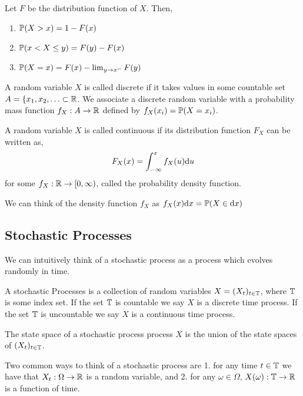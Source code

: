 \documentclass[12pt]{article}
\begin{document}
\begin{lemma}
Let \( F \) be the distribution function of \( X \). Then,
\begin{enumerate}[nolistsep]
    \item \( \mathbb{P}(X>x) = 1-F(x)\)
    \item \( \mathbb{P}(x<X\leq y) = F(y) - F(x) \)
    \item \( \mathbb{P}(X=x) = F(x) - \lim_{y\to x^-} F(y) \)
\end{enumerate}
\end{lemma}

\begin{definition}
A random variable \( X \) is called discrete if it takes values in some countable set \( A = \{x_1,x_2,\ldots  \subset \mathbb{R} \). We associate a discrete random variable with a probability mass function \( f_X:A\to\mathbb{R} \) defined by \( f_X(x_i) = \mathbb{P}(X = x_i) \).
\end{definition}

\begin{definition}
A random variable \( X \) is called continuous if its distribution function \( F_X \) can be written as,
\begin{align*}
    F_X(x) = \int_{-\infty}^{x} f_X(u) \mathrm{d} u
\end{align*}
for some \( f_X:\mathbb{R}\to[0,\infty) \), called the probability density function.
\end{definition}

We can think of the density function \( f_X \) as \( f_X(x)\mathrm{d} x = \mathbb{P}(X\in\mathrm{d} x) \)

\subsection{Stochastic Processes}
We can intuitively think of a stochastic process as a process which evolves randomly in time.
\begin{definition}
A stochastic Processes is a collection of random variables \( X = (X_t)_{t\in\mathbb{T}} \), where \( \mathbb{T} \) is some index set. If the set \( \mathbb{T} \) is countable we say \( X \) is a discrete time process. If the set \( \mathbb{T} \) is uncountable we say \( X \) is a continuous time process.

The state space of a stochastic process process \( X \) is the union of the state spaces of \( (X_t)_{t\in\mathbb{T}} \).
\end{definition}

Two common ways to think of a stochastic process are 1. for any time \( t\in\mathbb{T} \) we have that \( X_t: \Omega \to \mathbb{R} \) is a random variable, and 2. for any \( \omega \in \Omega \), \( X(\omega) : \mathbb{T}\to\mathbb{R} \) is a function of time.
\end{document}

